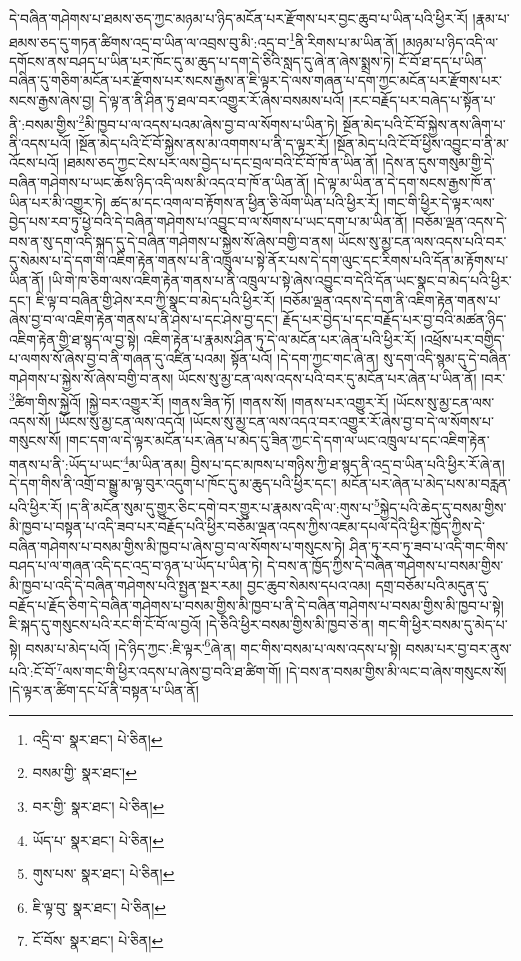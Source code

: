 དེ་བཞིན་གཤེགས་པ་ཐམས་ཅད་ཀྱང་མཉམ་པ་ཉིད་མངོན་པར་རྫོགས་པར་བྱང་ཆུབ་པ་ཡིན་པའི་ཕྱིར་རོ། །རྣམ་པ་ཐམས་ཅད་དུ་གཏན་ཚིགས་འདྲ་བ་ཡིན་ལ་འབྲས་བུ་མི་:འདྲ་བ་\footnote{འདྲི་བ་  སྣར་ཐང་།  པེ་ཅིན། }ནི་རིགས་པ་མ་ཡིན་ནོ། །མཉམ་པ་ཉིད་འདི་ལ་དགོངས་ནས་བཤད་པ་ཡིན་པར་ཁོང་དུ་མ་ཆུད་པ་དག་དེ་ཅིའི་སླད་དུ་ཞེ་ན་ཞེས་སྨྲས་ཏེ། ངོ་བོ་ཐ་དད་པ་ཡིན་བཞིན་དུ་གཅིག་མངོན་པར་རྫོགས་པར་སངས་རྒྱས་ན་ཇི་ལྟར་དེ་ལས་གཞན་པ་དག་ཀྱང་མངོན་པར་རྫོགས་པར་སངས་རྒྱས་ཞེས་བྱ། དེ་ལྟ་ན་ནི་ཤིན་ཏུ་ཐལ་བར་འགྱུར་རོ་ཞེས་བསམས་པའོ། །རང་བརྗོད་པར་བཞེད་པ་སྟོན་པ་ནི་:བསམ་གྱིས་\footnote{བསམ་གྱི་  སྣར་ཐང་། }མི་ཁྱབ་པ་ལ་འདས་པའམ་ཞེས་བྱ་བ་ལ་སོགས་པ་ཡིན་ཏེ། སྔོན་མེད་པའི་ངོ་བོ་སྐྱེས་ནས་ཞིག་པ་ནི་འདས་པའོ། །སྔོན་མེད་པའི་ངོ་བོ་སྐྱེས་ནས་མ་འགགས་པ་ནི་ད་ལྟར་རོ། །སྔོན་མེད་པའི་ངོ་བོ་ཕྱིས་འབྱུང་བ་ནི་མ་འོངས་པའོ། །ཐམས་ཅད་ཀྱང་ངེས་པར་ལས་བྱེད་པ་དང་བྲལ་བའི་ངོ་བོ་ཁོ་ན་ཡིན་ནོ། །དེས་ན་དུས་གསུམ་གྱི་དེ་བཞིན་གཤེགས་པ་ཡང་ཆོས་ཉིད་འདི་ལས་མི་འདའ་བ་ཁོ་ན་ཡིན་ནོ། །དེ་ལྟ་མ་ཡིན་ན་དེ་དག་སངས་རྒྱས་ཁོ་ན་ཡིན་པར་མི་འགྱུར་ཏེ། ཚད་མ་དང་འགལ་བ་རྟོགས་ན་ཕྱིན་ཅི་ལོག་ཡིན་པའི་ཕྱིར་རོ། །གང་གི་ཕྱིར་དེ་ལྟར་ལས་བྱེད་པས་རབ་ཏུ་ཕྱེ་བའི་དེ་བཞིན་གཤེགས་པ་འབྱུང་བ་ལ་སོགས་པ་ཡང་དག་པ་མ་ཡིན་ནོ། །བཅོམ་ལྡན་འདས་དེ་བས་ན་སུ་དག་འདི་སྐད་དུ་དེ་བཞིན་གཤེགས་པ་སྐྱེས་སོ་ཞེས་བགྱི་བ་ནས། ཡོངས་སུ་མྱ་ངན་ལས་འདས་པའི་བར་དུ་སེམས་པ་དེ་དག་གི་འཇིག་རྟེན་གནས་པ་ནི་འཁྲུལ་པ་སྟེ་ནོར་པས་དེ་དག་ལུང་དང་རིགས་པའི་དོན་མ་རྟོགས་པ་ཡིན་ནོ། །ཡི་གེ་ཁ་ཅིག་ལས་འཇིག་རྟེན་གནས་པ་ནི་འཁྲུལ་པ་སྟེ་ཞེས་འབྱུང་བ་དེའི་དོན་ཡང་སྣང་བ་མེད་པའི་ཕྱིར་དང་། ཇི་ལྟ་བ་བཞིན་གྱི་ཤེས་རབ་ཀྱི་སྣང་བ་མེད་པའི་ཕྱིར་རོ། །བཅོམ་ལྡན་འདས་དེ་དག་ནི་འཇིག་རྟེན་གནས་པ་ཞེས་བྱ་བ་ལ་འཇིག་རྟེན་གནས་པ་ནི་ཤེས་པ་དང་ཤེས་བྱ་དང་། རྗོད་པར་བྱེད་པ་དང་བརྗོད་པར་བྱ་བའི་མཚན་ཉིད་འཇིག་རྟེན་གྱི་ཐ་སྙད་ལ་བྱ་སྟེ། འཇིག་རྟེན་པ་རྣམས་ཤིན་ཏུ་དེ་ལ་མངོན་པར་ཞེན་པའི་ཕྱིར་རོ། །འཕྲོས་པར་བགྱིད་པ་ལགས་སོ་ཞེས་བྱ་བ་ནི་གཞན་དུ་འཛིན་པའམ། སྟོན་པའོ། །དེ་དག་ཀྱང་གང་ཞེ་ན། སུ་དག་འདི་སྙམ་དུ་དེ་བཞིན་གཤེགས་པ་སྐྱེས་སོ་ཞེས་བགྱི་བ་ནས། ཡོངས་སུ་མྱ་ངན་ལས་འདས་པའི་བར་དུ་མངོན་པར་ཞེན་པ་ཡིན་ནོ། །བར་\footnote{བར་གྱི་  སྣར་ཐང་།  པེ་ཅིན། }ཚིག་གིས་སྐྱེའོ། །སྐྱེ་བར་འགྱུར་རོ། །གནས་ཟིན་ཏོ། །གནས་སོ། །གནས་པར་འགྱུར་རོ། །ཡོངས་སུ་མྱ་ངན་ལས་འདས་སོ། །ཡོངས་སུ་མྱ་ངན་ལས་འདའོ། །ཡོངས་སུ་མྱ་ངན་ལས་འདའ་བར་འགྱུར་རོ་ཞེས་བྱ་བ་དེ་ལ་སོགས་པ་གསུངས་སོ། །གང་དག་ལ་དེ་ལྟར་མངོན་པར་ཞེན་པ་མེད་དུ་ཟིན་ཀྱང་དེ་དག་ལ་ཡང་འཁྲུལ་པ་དང་འཇིག་རྟེན་གནས་པ་ནི་:ཡོད་པ་ཡང་\footnote{ཡོད་པ་  སྣར་ཐང་།  པེ་ཅིན། }མ་ཡིན་ནམ། བྱིས་པ་དང་མཁས་པ་གཉིས་ཀྱི་ཐ་སྙད་ནི་འདྲ་བ་ཡིན་པའི་ཕྱིར་རོ་ཞེ་ན། དེ་དག་གིས་ནི་འགྲོ་བ་སྒྱུ་མ་ལྟ་བུར་འདུག་པ་ཁོང་དུ་མ་ཆུད་པའི་ཕྱིར་དང་། མངོན་པར་ཞེན་པ་མེད་པས་མ་བརླན་པའི་ཕྱིར་རོ། །ད་ནི་མངོན་སུམ་དུ་གྱུར་ཅིང་དགེ་བར་གྱུར་པ་རྣམས་འདི་ལ་:གུས་པ་\footnote{གུས་པས་  སྣར་ཐང་།  པེ་ཅིན། }སྐྱེད་པའི་ཆེད་དུ་བསམ་གྱིས་མི་ཁྱབ་པ་བསྟན་པ་འདི་ཟབ་པར་བརྗོད་པའི་ཕྱིར་བཅོམ་ལྡན་འདས་ཀྱིས་འཇམ་དཔལ་དེའི་ཕྱིར་ཁྱོད་ཀྱིས་དེ་བཞིན་གཤེགས་པ་བསམ་གྱིས་མི་ཁྱབ་པ་ཞེས་བྱ་བ་ལ་སོགས་པ་གསུངས་ཏེ། ཤིན་ཏུ་རབ་ཏུ་ཟབ་པ་འདི་གང་གིས་བཤད་པ་ལ་གཞན་འདི་དང་འདྲ་བ་ཉན་པ་ཡོད་པ་ཡིན་ཏེ། དེ་བས་ན་ཁྱོད་ཀྱིས་དེ་བཞིན་གཤེགས་པ་བསམ་གྱིས་མི་ཁྱབ་པ་འདི་དེ་བཞིན་གཤེགས་པའི་སྤྱན་སྔར་རམ། བྱང་ཆུབ་སེམས་དཔའ་འམ། དགྲ་བཅོམ་པའི་མདུན་དུ་བརྗོད་པ་རྗོད་ཅིག་དེ་བཞིན་གཤེགས་པ་བསམ་གྱིས་མི་ཁྱབ་པ་ནི་དེ་བཞིན་གཤེགས་པ་བསམ་གྱིས་མི་ཁྱབ་པ་སྟེ། ཇི་སྐད་དུ་གསུངས་པའི་རང་གི་ངོ་བོ་ལ་བྱའོ། །དེ་ཅིའི་ཕྱིར་བསམ་གྱིས་མི་ཁྱབ་ཅེ་ན། གང་གི་ཕྱིར་བསམ་དུ་མེད་པ་སྟེ། བསམ་པ་མེད་པའོ། །དེ་ཉིད་ཀྱང་:ཇི་ལྟར་\footnote{ཇི་ལྟ་བུ་  སྣར་ཐང་།  པེ་ཅིན། }ཞེ་ན། གང་གིས་བསམ་པ་ལས་འདས་པ་སྟེ། བསམ་པར་བྱ་བར་ནུས་པའི་:ངོ་བོ་\footnote{ངོ་བོས་  སྣར་ཐང་།  པེ་ཅིན། }ལས་གང་གི་ཕྱིར་འདས་པ་ཞེས་བྱ་བའི་ཐ་ཚིག་གོ། །དེ་བས་ན་བསམ་གྱིས་མི་ལང་བ་ཞེས་གསུངས་སོ། །དེ་ལྟར་ན་ཚིག་དང་པོ་ནི་བསྟན་པ་ཡིན་ནོ། 